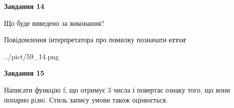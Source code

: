 \documentclass[11pt, ukrainian]{article}
\begin{document}
{\begin {large}
{\begin {center}\textbf{Завдання 14}\end {center}}\par
Що буде виведено за виконання? \par
Повідомлення інтерпретатора про помилку позначати \textbf{error}

\begin{center}
	{../pict/59_14.png}
\end{center}
\newpage

{\begin {center}\textbf{Завдання 15}\end {center}}\par

Написати функцiю f, що отримує 3 числа і повертає ознаку того, що вони попарно рiзнi. Стиль запису умови також оцінюється.\par
\newpage

\end {large}}
\end{document}
